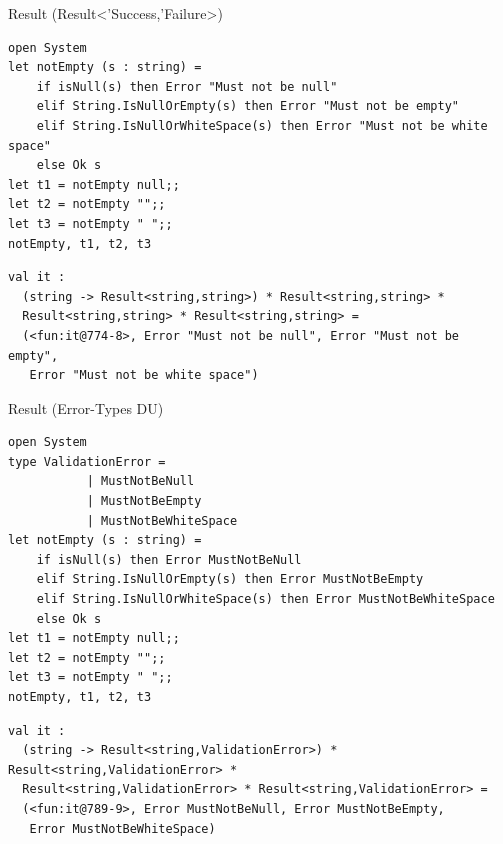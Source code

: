 \documentclass[t]{beamer}
\begin{document}
\begin{frame}[label={sec:orgb56dfa1},fragile]{Result (Result<'Success,'Failure>)}
 \begin{verbatim}
open System
let notEmpty (s : string) =
    if isNull(s) then Error "Must not be null"
    elif String.IsNullOrEmpty(s) then Error "Must not be empty"
    elif String.IsNullOrWhiteSpace(s) then Error "Must not be white space"
    else Ok s
let t1 = notEmpty null;;
let t2 = notEmpty "";;
let t3 = notEmpty " ";;
notEmpty, t1, t2, t3
\end{verbatim}

\begin{verbatim}
val it :
  (string -> Result<string,string>) * Result<string,string> *
  Result<string,string> * Result<string,string> =
  (<fun:it@774-8>, Error "Must not be null", Error "Must not be empty",
   Error "Must not be white space")
\end{verbatim}
\end{frame}

\begin{frame}[label={sec:orgd67faa8},fragile]{Result (Error-Types DU)}
 \begin{verbatim}
open System
type ValidationError =
           | MustNotBeNull
           | MustNotBeEmpty
           | MustNotBeWhiteSpace
let notEmpty (s : string) =
    if isNull(s) then Error MustNotBeNull
    elif String.IsNullOrEmpty(s) then Error MustNotBeEmpty
    elif String.IsNullOrWhiteSpace(s) then Error MustNotBeWhiteSpace
    else Ok s
let t1 = notEmpty null;;
let t2 = notEmpty "";;
let t3 = notEmpty " ";;
notEmpty, t1, t2, t3
\end{verbatim}

\begin{verbatim}
val it :
  (string -> Result<string,ValidationError>) * Result<string,ValidationError> *
  Result<string,ValidationError> * Result<string,ValidationError> =
  (<fun:it@789-9>, Error MustNotBeNull, Error MustNotBeEmpty,
   Error MustNotBeWhiteSpace)
\end{verbatim}
\end{frame}
\end{document}

